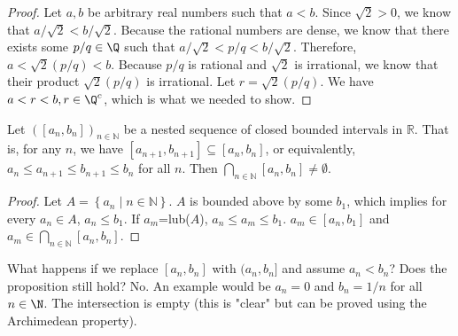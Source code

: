 \documentclass[10pt]{article}
\begin{document}
\begin{proof}
    Let $a,b$ be arbitrary real numbers such that $a<b$. Since $\sqrt{2}>0$, we know that ${a}/{\sqrt{2}}<{b}/{\sqrt{2}}$. Because the rational numbers are dense, we know that there exists some ${p}/{q}\in\Q$ such that ${a}/{\sqrt{2}}<{p}/{q}<{b}/{\sqrt{2}}$. Therefore, \(a<\sqrt{2}({p}/{q})<b\). Because ${p}/{q}$ is rational and $\sqrt{2}$ is irrational, we know that their product $\sqrt{2}({p}/{q})$ is irrational. Let $r=\sqrt{2}({p}/{q})$. We have
    \(a<r<b,r\in\Q^c\), which is what we needed to show.
\end{proof}
\begin{proposition}
    Let $([a_n,b_n])_{n\in \mathbb{N}}$ be a nested sequence of closed bounded intervals in $\mathbb{R}$. That is, for any $n$, we have $[a_{n+1},b_{n+1}]\subseteq [a_{n},b_{n}]$, or equivalently, $a_n\leq a_{n+1}\leq b_{n+1}\leq b_n$ for all $n$. Then $\bigcap_{n\in \mathbb{N}}^{} [a_n,b_n]\neq \emptyset $.
\end{proposition}
\begin{proof}
    Let $A=\left \{ a_n\mid n\in \mathbb{N} \right \}$. $A$ is bounded above by some $b_1$, which implies for every $a_n\in A$, $a_n\leq b_1$. If $a_m$=lub($A$), $a_n\leq a_m\leq b_1$. $a_m\in [a_n,b_1]$ and $a_m\in \bigcap_{n\in \mathbb{N}}^{} [a_n,b_n]$.
\end{proof}
\begin{remark}
    What happens if we replace $[a_n,b_n]$ with $(a_n,b_n]$ and assume $a_n<b_n$? Does the proposition still hold?
    {No}. An example would be $a_n=0$ and $b_n={1}/{n}$ for all $n\in\N$. The intersection is empty (this is "clear" but can be proved using the Archimedean property).
\end{remark}


\newpage
\end{document}
